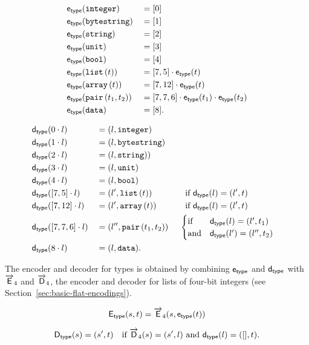 \begin{alignat*}{2}
  &\etype(\ty{integer})      &&= [0]  \\
  &\etype(\ty{bytestring})   &&= [1]  \\
  &\etype(\ty{string})       &&= [2]  \\
  &\etype(\ty{unit})         &&= [3]  \\
  &\etype(\ty{bool})         &&= [4]  \\
  &\etype(\listOf{t})        &&= [7,5] \cdot \etype(t) \\
  &\etype(\arrayOf{t})       &&= [7,12] \cdot \etype(t) \\
  &\etype(\pairOf{t_1}{t_2}) &&= [7,7,6] \cdot \etype(t_1) \cdot \etype(t_2)\\
  &\etype(\ty{data})         &&= [8].
\end{alignat*}

\begin{alignat*}{3}
 &\dtype(0 \cdot l) &&= (l, \ty{integer})    \\
 &\dtype(1 \cdot l) &&= (l, \ty{bytestring}) \\
 &\dtype(2 \cdot l) &&= (l, \ty{string}))    \\
 &\dtype(3 \cdot l) &&= (l, \ty{unit})       \\
 &\dtype(4 \cdot l) &&= (l, \ty{bool})       \\
 &\dtype([7,5] \cdot l) &&= (l', \listOf{t}) &&\quad \text{if $\dtype(l) = (l', t)$}\\
 &\dtype([7,12] \cdot l) &&= (l', \arrayOf{t}) &&\quad \text{if $\dtype(l) = (l', t)$}\\
 &\dtype([7,7,6] \cdot l) &&= (l'', \pairOf{t_1}{t_2})
  &&\ \begin{cases}
      \text{if} & \dtype(l) = (l', t_1)\\
      \text{and} & \dtype(l') = (l'', t_2)
    \end{cases}\\
  &\dtype(8 \cdot l) &&= (l, \ty{data}).
\end{alignat*}

\noindent The encoder and decoder for types is obtained by combining $\etype$
and $\dtype$ with $\Elist_4$ and $\Dlist_4$, the encoder and decoder for lists
of four-bit integers (see Section~\ref{sec:basic-flat-encodings}).

$$
\Etype(s,t) = \Elist_4 (s, \etype(t))
$$

$$
\Dtype(s) = (s', t) \quad \text{if $\Dlist_4(s) = (s', l)$ and $\dtype(l) = ([], t)$}.
$$

